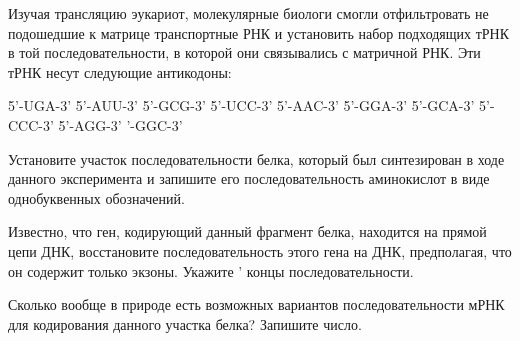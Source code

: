 
Изучая трансляцию эукариот, молекулярные биологи смогли отфильтровать не подошедшие к матрице транспортные 
РНК и установить набор подходящих тРНК в той последовательности, в которой они связывались с матричной РНК. 
Эти тРНК несут следующие антикодоны:

5'-UGA-3' 5'-AUU-3' 5'-GCG-3' 5'-UCC-3' 5'-AAC-3' 5'-GGA-3' 5'-GCA-3' 5'-CCC-3' 5'-AGG-3' '-GGC-3'

Установите участок последовательности белка, который был синтезирован в ходе данного эксперимента и запишите 
его последовательность аминокислот в виде однобуквенных обозначений.

Известно, что ген, кодирующий данный фрагмент белка, находится на прямой цепи ДНК, восстановите последовательность 
этого гена на ДНК, предполагая, что он содержит только экзоны. Укажите ' концы последовательности.

Сколько вообще в природе есть возможных вариантов последовательности мРНК для кодирования данного участка белка? 
Запишите число.
